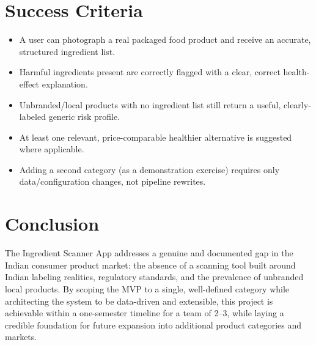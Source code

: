 \documentclass[11pt,a4paper]{article}
\begin{document}
\section{Success Criteria}
\begin{itemize}
  \item A user can photograph a real packaged food product and receive an accurate, structured ingredient list.
  \item Harmful ingredients present are correctly flagged with a clear, correct health-effect explanation.
  \item Unbranded/local products with no ingredient list still return a useful, clearly-labeled generic risk profile.
  \item At least one relevant, price-comparable healthier alternative is suggested where applicable.
  \item Adding a second category (as a demonstration exercise) requires only data/configuration changes, not pipeline rewrites.
\end{itemize}

\section{Conclusion}
The Ingredient Scanner App addresses a genuine and documented gap in the Indian consumer product market: the absence of a scanning tool built around Indian labeling realities, regulatory standards, and the prevalence of unbranded local products. By scoping the MVP to a single, well-defined category while architecting the system to be data-driven and extensible, this project is achievable within a one-semester timeline for a team of 2--3, while laying a credible foundation for future expansion into additional product categories and markets.
\end{document}

